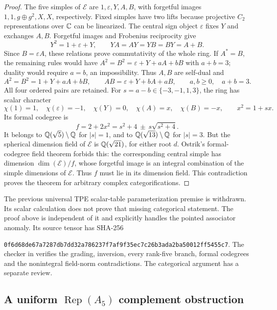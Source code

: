 \begin{proof}
The five simples of $\mathcal E$ are $1,\varepsilon,Y,A,B$, with
forgetful images $1,1,g\oplus g^2,X,X$, respectively. Fixed simples
have two lifts because projective $C_2$ representations over $\mathbb C$ can
be linearized. The central sign object $\varepsilon$ fixes $Y$ and
exchanges $A,B$. Forgetful images and Frobenius reciprocity give
\[
Y^2=1+\varepsilon+Y,\qquad YA=AY=YB=BY=A+B.
\]
Since $B=\varepsilon A$, these relations prove commutativity of the
whole ring. If $A^*=B$, the remaining rules would have
$A^2=B^2=\varepsilon+Y+aA+bB$ with $a+b=3$; duality would require
$a=b$, an impossibility. Thus $A,B$ are self-dual and
\[
A^2=B^2=1+Y+aA+bB,\qquad
AB=\varepsilon+Y+bA+aB,\qquad a,b\geq0,\quad a+b=3.
\]
All four ordered pairs are retained. For $s=a-b\in\{-3,-1,1,3\}$,
the ring has scalar character
\[
\chi(1)=1,\quad\chi(\varepsilon)=-1,\quad\chi(Y)=0,
\quad\chi(A)=x,\quad\chi(B)=-x,\qquad x^2=1+sx.
\]
Its formal codegree is
\[
f=2+2x^2=s^2+4\ \pm\ s\sqrt{s^2+4}.
\]
It belongs to $\mathbb Q(\sqrt5)\setminus\mathbb Q$ for $|s|=1$, and to
$\mathbb Q(\sqrt{13})\setminus\mathbb Q$ for $|s|=3$. But the spherical dimension
field of $\mathcal E$ is $\mathbb Q(\sqrt{21})$, for either root $d$.
Ostrik's formal-codegree field theorem
\cite[Theorem~2.13 and Corollary~2.15]{OstrikPiv3} forbids this: the
corresponding central simple has dimension $\dim(\mathcal E)/f$, whose
forgetful image is an integral combination of the simple dimensions of
$\mathcal E$. Thus $f$ must lie in its dimension field. This contradiction
proves the theorem for arbitrary complex categorifications.
\end{proof}
\begin{remark}
The previous universal TPE scalar-table parameterization premise is
withdrawn. Its scalar calculation does not prove that missing categorical
statement. The proof above is independent of it and explicitly handles
the pointed associator anomaly. Its source tensor has SHA-256
\par\noindent\nolinkurl{0f6d68de67a7287db7dd32a786237f7af9f35ec7c26b3ada2ba50012ff5455c7}.
The checker in  verifies the grading,
inversion, every rank-five branch, formal codegrees and the nonintegral
field-norm contradictions. The categorical argument has a separate review.
\end{remark}

\subsection{A uniform $\operatorname{Rep}(A_5)$ complement obstruction}
\label{sec:rank8-a5-complement}

